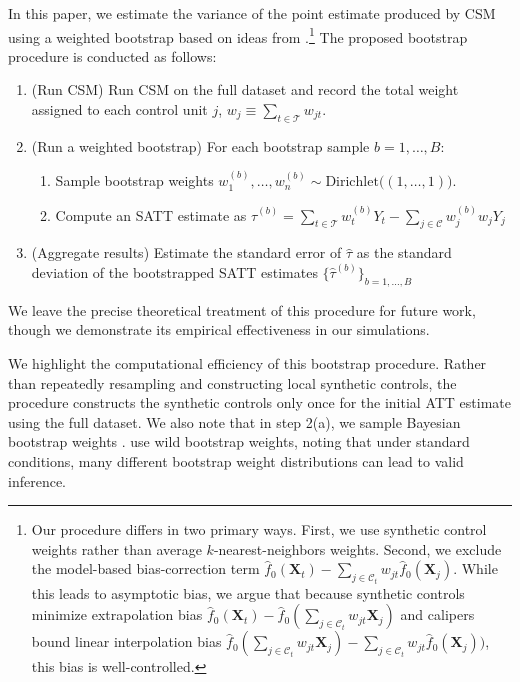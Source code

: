 \documentclass{article}
\newcommand{\Xt}{\mathbf{X}_t}
\newcommand{\Xj}{\mathbf{X}_j}
\newcommand{\Ct}{\mathcal{C}_{t}}
\begin{document}
In this paper, we estimate the variance of the point estimate produced by CSM using a weighted bootstrap based on ideas from \citet{otsu2017bootstrap}.\footnote{
    Our procedure differs in two primary ways. 
    First, we use synthetic control weights rather than average $k$-nearest-neighbors weights. 
    Second, we exclude the model-based bias-correction term $\hat{f}_0(\Xt) - \sum_{j \in \Ct} w_{jt} \hat{f}_0(\Xj)$.
    While this leads to asymptotic bias, we argue that because synthetic controls minimize extrapolation bias $\hat{f}_0(\Xt) - \hat{f}_0(\sum_{j \in \Ct} w_{jt} \Xj)$ and calipers bound linear interpolation bias $\hat{f}_0(\sum_{j \in \Ct} w_{jt} \Xj) - \sum_{j \in \Ct} w_{jt} \hat{f}_0(\Xj))$, this bias is well-controlled.}
The proposed bootstrap procedure is conducted as follows:
\begin{enumerate}
    \item (Run CSM) Run CSM on the full dataset and record the total weight assigned to each control unit $j$, $w_j \equiv \sum_{t \in \mathcal{T}} w_{jt}$.
    \item (Run a weighted bootstrap) For each bootstrap sample $b = 1, \dots, B$:
    \begin{enumerate}
        \item Sample bootstrap weights $w^{(b)}_1, \dots, w^{(b)}_n \sim \text{Dirichlet}\Big((1, \dots, 1)\Big)$.
        \item Compute an SATT estimate as $\hat{\tau}^{(b)} = \sum_{t \in \mathcal{T}} w_t^{(b)} Y_t - \sum_{j \in \mathcal{C}} w_j^{(b)} w_j Y_j$
    \end{enumerate}
    \item (Aggregate results) Estimate the standard error of $\hat{\tau}$ as the standard deviation of the bootstrapped SATT estimates $\{\hat{\tau}^{(b)}\}_{b = 1, \dots, B}$
\end{enumerate}
We leave the precise theoretical treatment of this procedure for future work, though we demonstrate its empirical effectiveness in our simulations.

We highlight the computational efficiency of this bootstrap procedure.
Rather than repeatedly resampling and constructing local synthetic controls, the procedure constructs the synthetic controls only once for the initial ATT estimate using the full dataset.
We also note that in step 2(a), we sample Bayesian bootstrap weights \citep{rubin1981bayesian}.
\citet{otsu2017bootstrap} use wild bootstrap weights, noting that under standard conditions, many different bootstrap weight distributions can lead to valid inference.
\end{document}
